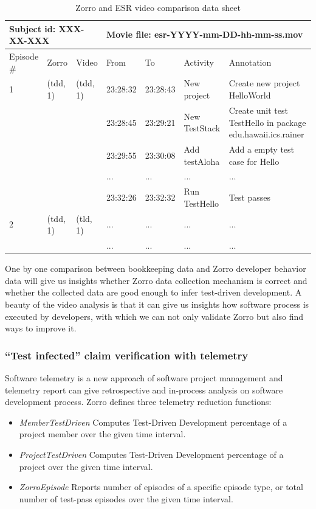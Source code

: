 \begin{table}[htbp]
\centering
  \caption{Zorro and ESR video comparison data sheet}\label{tab:video-narrate}
  \begin{tabular}{|l|l||l|l|l|l|p{3.5cm}|} \hline 
    \multicolumn{3}{|l}{Subject id: XXX-XX-XXX} & \multicolumn{4}{l|}{Movie file: esr-YYYY-mm-DD-hh-mm-ss.mov} \\ \hline\hline
    Episode \# & Zorro & Video & From & To & Activity & Annotation \\ \hline
    1 & (tdd, 1) & (tdd, 1) & 23:28:32 & 23:28:43 & New project & Create new project HelloWorld \\ \hline
          &          &          & 23:28:45 & 23:29:21 & New TestStack & Create unit test TestHello in package edu.hawaii.ics.rainer \\ \hline
          &          &          & 23:29:55 & 23:30:08 & Add testAloha & Add a empty test case for Hello \\ \hline
          &          &          & ...      & ...      & ... & ... \\\hline
          &          &          & 23:32:26 & 23:32:32 & Run TestHello & Test passes \\ \hline\hline
    2 & (tdd, 1) & (tld, 1) & ... & ... & ... & ... \\ \hline
          &          &          & ... & ... & ... & ... \\ \hline
  \end{tabular}

\end{table}
One by one comparison between bookkeeping data and Zorro developer behavior
data will give us insights whether Zorro data collection mechanism is
correct and whether the collected data are good enough to infer test-driven
development. A beauty of the video analysis is that it can give us insights
how software process is executed by developers, with which we can not only
validate Zorro but also find ways to improve it.

\subsubsection{``Test infected'' claim verification with telemetry}
Software telemetry \cite{csdl2-04-11} is a new approach of software project
management and telemetry report can give retrospective and in-process
analysis on software development process. Zorro defines three telemetry
reduction functions:
\begin{itemize}
\item \textit{MemberTestDriven} Computes Test-Driven Development percentage
  of a project member over the given time interval.
\item \textit{ProjectTestDriven} Computes Test-Driven Development
  percentage of a project over the given time interval.
\item \textit{ZorroEpisode} Reports number of episodes of a specific
  episode type, or total number of test-pass episodes over the given time
  interval.
\end{itemize}

